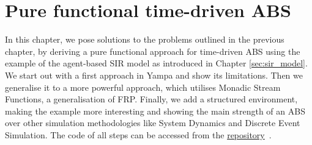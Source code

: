 \chapter{Pure functional time-driven ABS}
\label{ch:timedriven}

In this chapter, we pose solutions to the problems outlined in the previous chapter, by deriving a pure functional approach for time-driven ABS using the example of the agent-based SIR model as introduced in Chapter \ref{sec:sir_model}. We start out with a first approach in Yampa and show its limitations. Then we generalise it to a more powerful approach, which utilises Monadic Stream Functions, a generalisation of FRP. Finally, we add a structured environment, making the example more interesting and showing the main strength of an ABS over other simulation methodologies like System Dynamics and Discrete Event Simulation. The code of all steps can be accessed from the \href{https://github.com/thalerjonathan/haskell-sir}{repository}~\cite{thaler_sir_repository}.







